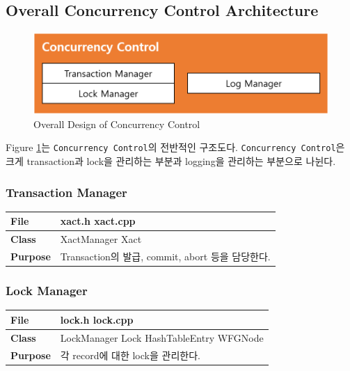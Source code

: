 \documentclass[main.tex]{subfiles}
\begin{document}
\subsection{Overall Concurrency Control Architecture}

\begin{figure}[!hbt]
	\centering
	\includegraphics[width=.7\textwidth]{images/cc/overall_design.png}
	\caption{Overall Design of Concurrency Control}
	\label{cc:overall_design}
\end{figure}

Figure \ref{cc:overall_design}는 \texttt{Concurrency Control}의 전반적인 구조도다. \texttt{Concurrency Control}은 크게 transaction과 lock을 관리하는 부분과 logging을 관리하는 부분으로 나뉜다.

\subsubsection{Transaction Manager}
\begin{table}[!htb]
	\begin{tabularx}{\textwidth}{|l|X|}
		\hline
		\textbf{File} & xact.h xact.cpp \\
		\hline
		\textbf{Class} & XactManager Xact \\
		\hline
		\textbf{Purpose} & Transaction의 발급, commit, abort 등을 담당한다. \\
		\hline
	\end{tabularx}
\end{table}

\subsubsection{Lock Manager}
\begin{table}[!htb]
	\begin{tabularx}{\textwidth}{|l|X|}
		\hline
		\textbf{File} & lock.h lock.cpp \\
		\hline
		\textbf{Class} & LockManager Lock HashTableEntry WFGNode \\
		\hline
		\textbf{Purpose} & 각 record에 대한 lock을 관리한다. \\
		\hline
	\end{tabularx}
\end{table}
\end{document}
